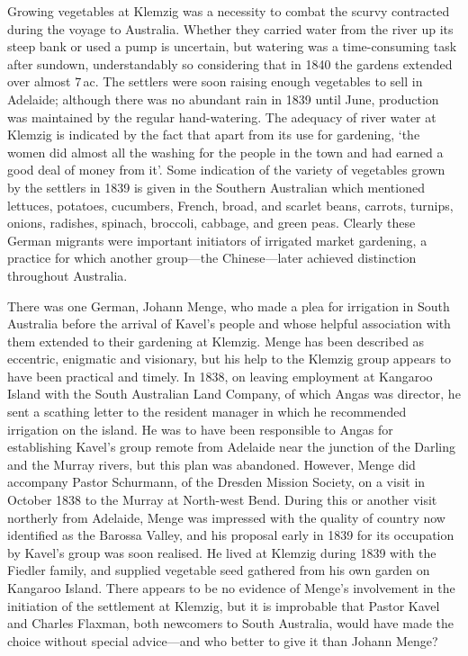Growing vegetables at Klemzig was a necessity to combat the scurvy
contracted during the voyage to Australia.  Whether they carried water
from the river up its steep bank or used a pump is uncertain, but
watering was a time-consuming task after sundown, understandably so
considering that in 1840 the gardens extended over almost
7\,ac.  The settlers
were soon raising enough vegetables to sell in Adelaide; although
there was no abundant rain in 1839 until June, production was
maintained by the regular hand-watering.  The adequacy of river water
at Klemzig is indicated by the fact that apart from its use for
gardening, `the women did almost all the washing for the people in the
town and had earned a good deal of money from
it'.  Some indication of the
variety of vegetables grown by the settlers in 1839 is given in the
Southern Australian which mentioned lettuces, potatoes, cucumbers,
French, broad, and scarlet beans, carrots, turnips, onions, radishes,
spinach, broccoli, cabbage, and green peas. Clearly these
German migrants were important initiators of irrigated market
gardening, a practice for which another group---the Chinese---later
achieved distinction throughout Australia.

There was one German, Johann Menge, who made a plea for irrigation in
South Australia before the arrival of Kavel's people and whose helpful
association with them extended to their gardening at Klemzig.  Menge
has been described as eccentric, enigmatic and visionary, but his help
to the Klemzig group appears to have been practical and timely.  In
1838, on leaving employment at Kangaroo Island with the South
Australian Land Company, of which Angas was director, he sent a
scathing letter to the resident manager in which he recommended
irrigation on the island.  He was to have been responsible to Angas for
establishing Kavel's group remote from Adelaide near the junction of
the Darling and the Murray rivers, but this plan was abandoned.
However, Menge did accompany Pastor Schurmann, of the Dresden Mission
Society, on a visit in October 1838 to the Murray at North-west
Bend.  During this or another visit northerly
from Adelaide, Menge was impressed with the quality of country now
identified as the Barossa Valley, and his proposal early in 1839 for
its occupation by Kavel's group was soon realised.  He lived at
Klemzig during 1839 with the Fiedler family, and supplied vegetable
seed gathered from his own garden on Kangaroo
Island.  There appears to be no
evidence of Menge's involvement in the initiation of the settlement at
Klemzig, but it is improbable that Pastor Kavel and Charles Flaxman,
both newcomers to South Australia, would have made the choice without
special advice---and who better to give it than Johann Menge?

